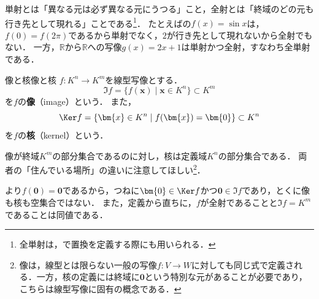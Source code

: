 単射とは「異なる元は必ず異なる元にうつる」こと，全射とは「終域のどの元も行き先として現れる」ことである\footnote{全単射は，で置換を定義する際にも用いられる．}．
たとえばの$f(x) = \sin x$は，$f(0) = f(2\pi)$であるから単射でなく，$2$が行き先として現れないから全射でもない．
一方，$\mathbb{R}$から$\mathbb{R}$への写像$g(x) = 2x + 1$は単射かつ全射，すなわち全単射である．


\begin{definition}{像と核}{像と核}
  $f \colon K^n \to K^m$を線型写像とする．
  \[
    \Im f = \{ f(\bm{x}) \mid \bm{x} \in K^n \} \subset K^m
  \]
  を$f$の\textbf{像}（image）という．
  また，
  \[
    \Ker f = \{ \bm{x} \in K^n \mid f(\bm{x}) = \bm{0} \} \subset K^n
  \]
  を$f$の\textbf{核}（kernel）という．
\end{definition}

像が終域$K^m$の部分集合であるのに対し，核は定義域$K^n$の部分集合である．
両者の「住んでいる場所」の違いに注意してほしい\footnote{像は，線型とは限らない一般の写像$f \colon V \to W$に対しても同じ式で定義される．一方，核の定義には終域に$\bm{0}$という特別な元があることが必要であり，こちらは線型写像に固有の概念である．}．

より$f(\bm{0}) = \bm{0}$であるから，つねに$\bm{0} \in \Ker f$かつ$\bm{0} \in \Im f$であり，とくに像も核も空集合ではない．
また，定義から直ちに，$f$が全射であることと$\Im f = K^m$であることは同値である．

